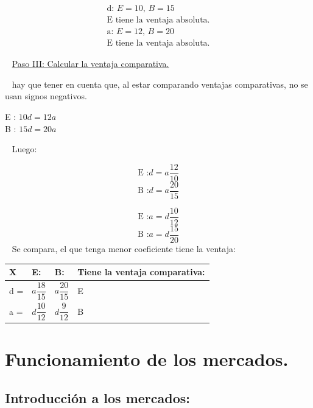 \documentclass[
  letterpaper,
  DIV=11,
  numbers=noendperiod]{scrreport}
\begin{document}
\[
\begin{matrix}    \text{d: $E = 10$, $B = 15$} \\    \text{E tiene la ventaja absoluta.}\\    \text{a: $E = 12$, $B = 20$} \\    \text{E tiene la ventaja absoluta.}\end{matrix}
\]

~ \ul{Paso III: Calcular la ventaja comparativa.}

~ hay que tener en cuenta que, al estar comparando ventajas
comparativas, no se usan signos negativos.

\begin{center}
        E : $10d = 12a$ \\
        B : $15d = 20a$
\end{center}

~ Luego:

\[
\textrm{E :} d = a\frac{12}{10}
\] \[
\textrm{B :} d = a\frac{20}{15}
\]

\[
\textrm{E :} a = d\frac{10}{12}
\] \[
\textrm{B :} a = d\frac{15}{20}
\] ~ Se compara, el que tenga menor coeficiente tiene la ventaja:

\begin{table}[H]
    \centering
    \begin{tabular}{|p{10mm}|p{10mm}|p{10mm}|p{25mm}|}
        \hline
        X & E: & B: & Tiene la ventaja comparativa: \\ \hline
        d = \par & $a\dfrac{18}{15}$ & $a\dfrac{20}{15}$ & E \\ \hline
        a = \par & $d\dfrac{10}{12}$ & $d\dfrac{9}{12}$ & B \\ \hline
    \end{tabular}
\end{table}


\hypertarget{funcionamiento-de-los-mercados.}{%
\chapter{Funcionamiento de los
mercados.}\label{funcionamiento-de-los-mercados.}}

\hypertarget{introducciuxf3n-a-los-mercados}{%
\section{Introducción a los
mercados:}\label{introducciuxf3n-a-los-mercados}}
\end{document}
